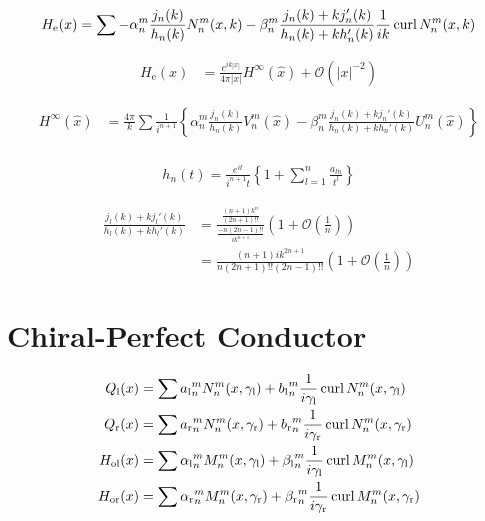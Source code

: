 \begin{align*}
  H_{\text{e}}(x) &= \sum -\alpha_n^m \frac{j_n(k)}{h_n(k)} N_n^m(x, k) - \beta_n^m  \frac{j_n(k) + k j_n'(k)}{h_n(k) + k h_n'(k)}\frac{1}{ik}\operatorname{curl} N_n^m(x, k) \\
\end{align*}

\begin{align*}
  H_{\text{e}}(x) &= \frac{e^{i k |x|}}{4\pi |x|}H^\infty(\hat{x}) + \mathcal{O}(|x|^{-2})
\end{align*}

\begin{align*}
  H^\infty(\hat{x}) &= \frac{4\pi}{k}\sum\frac{1}{i^{n+1}}\left\{\alpha_n^m \frac{j_n(k)}{h_n(k)} V_n^m(\hat{x}) - \beta_n^m \frac{j_n(k) + k j_n'(k)}{h_n(k) + k h_n'(k)} U_n^m(\hat{x}) \right\} \\
\end{align*}

\begin{align*}
  h_n(t) = \frac{e^{it}}{i^{n+1}t}\left\{1 + \sum_{l=1}^n\frac{a_{ln}}{t^l}\right\}
\end{align*}

\begin{align*}
  \frac{j_l(k) + k j_l'(k)}{h_l(k) + k h_l'(k)} %
  &=\frac{\frac{(n+1)k^n}{(2n+1)!!}}{\frac{-n(2n-1)!!}{ik^{n+1}}}\left(1+\mathcal{O}\left(\frac{1}{n}\right)\right) \\
  &=\frac{(n+1)ik^{2n+1}}{n(2n+1)!!(2n-1)!!}\left(1+\mathcal{O}\left(\frac{1}{n}\right)\right)
\end{align*}

\section{Chiral-Perfect Conductor}

\begin{align*}
  Q_\text{l}(x) &= \sum {a_\text{l}}_n^m N_n^m(x, \gamma_\text{l}) + {b_\text{l}}_n^m\frac{1}{i\gamma_\text{l}}\operatorname{curl} N_n^m(x, \gamma_\text{l}) \\
  Q_\text{r}(x) &= \sum {a_\text{r}}_n^m N_n^m(x, \gamma_\text{r}) + {b_\text{r}}_n^m\frac{1}{i\gamma_\text{r}}\operatorname{curl} N_n^m(x, \gamma_\text{r}) \\
  H_{\text{ol}}(x) &= \sum{\alpha_\text{l}}_n^m M_n^m(x, \gamma_\text{l}) + {\beta_\text{l}}_n^m\frac{1}{i\gamma_\text{l}}\operatorname{curl} M_n^m(x, \gamma_\text{l}) \\
  H_{\text{or}}(x) &= \sum{\alpha_\text{r}}_n^m M_n^m(x, \gamma_\text{r}) + {\beta_\text{r}}_n^m\frac{1}{i\gamma_\text{r}}\operatorname{curl} M_n^m(x, \gamma_\text{r}) \\
\end{align*}

